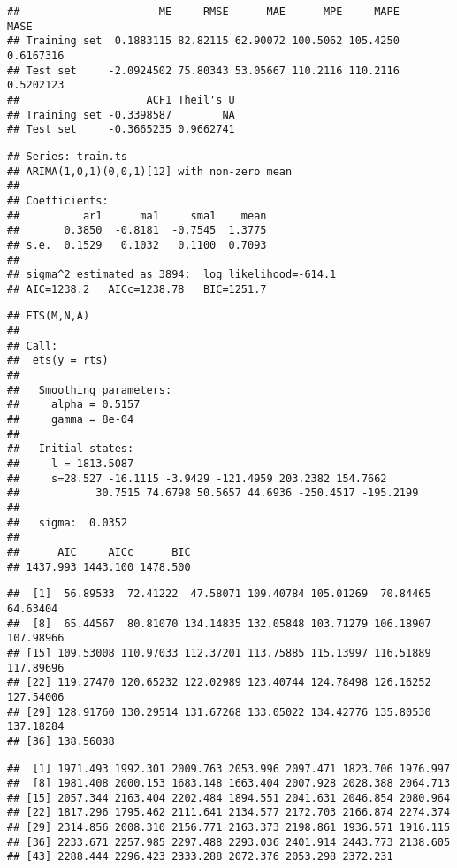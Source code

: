 \documentclass[]{article}
\begin{document}
\begin{verbatim}
##                      ME     RMSE      MAE      MPE     MAPE      MASE
## Training set  0.1883115 82.82115 62.90072 100.5062 105.4250 0.6167316
## Test set     -2.0924502 75.80343 53.05667 110.2116 110.2116 0.5202123
##                    ACF1 Theil's U
## Training set -0.3398587        NA
## Test set     -0.3665235 0.9662741
\end{verbatim}

\begin{verbatim}
## Series: train.ts 
## ARIMA(1,0,1)(0,0,1)[12] with non-zero mean 
## 
## Coefficients:
##          ar1      ma1     sma1    mean
##       0.3850  -0.8181  -0.7545  1.3775
## s.e.  0.1529   0.1032   0.1100  0.7093
## 
## sigma^2 estimated as 3894:  log likelihood=-614.1
## AIC=1238.2   AICc=1238.78   BIC=1251.7
\end{verbatim}

\begin{verbatim}
## ETS(M,N,A) 
## 
## Call:
##  ets(y = rts) 
## 
##   Smoothing parameters:
##     alpha = 0.5157 
##     gamma = 8e-04 
## 
##   Initial states:
##     l = 1813.5087 
##     s=28.527 -16.1115 -3.9429 -121.4959 203.2382 154.7662
##            30.7515 74.6798 50.5657 44.6936 -250.4517 -195.2199
## 
##   sigma:  0.0352
## 
##      AIC     AICc      BIC 
## 1437.993 1443.100 1478.500
\end{verbatim}

\begin{verbatim}
##  [1]  56.89533  72.41222  47.58071 109.40784 105.01269  70.84465  64.63404
##  [8]  65.44567  80.81070 134.14835 132.05848 103.71279 106.18907 107.98966
## [15] 109.53008 110.97033 112.37201 113.75885 115.13997 116.51889 117.89696
## [22] 119.27470 120.65232 122.02989 123.40744 124.78498 126.16252 127.54006
## [29] 128.91760 130.29514 131.67268 133.05022 134.42776 135.80530 137.18284
## [36] 138.56038
\end{verbatim}

\begin{verbatim}
##  [1] 1971.493 1992.301 2009.763 2053.996 2097.471 1823.706 1976.997
##  [8] 1981.408 2000.153 1683.148 1663.404 2007.928 2028.388 2064.713
## [15] 2057.344 2163.404 2202.484 1894.551 2041.631 2046.854 2080.964
## [22] 1817.296 1795.462 2111.641 2134.577 2172.703 2166.874 2274.374
## [29] 2314.856 2008.310 2156.771 2163.373 2198.861 1936.571 1916.115
## [36] 2233.671 2257.985 2297.488 2293.036 2401.914 2443.773 2138.605
## [43] 2288.444 2296.423 2333.288 2072.376 2053.298 2372.231
\end{verbatim}
\end{document}
